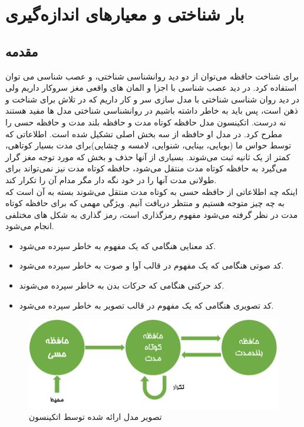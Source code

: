 \section{بار شناختی و معیارهای اندازه‌گیری}
\label{s:CognitiveLoad}
\subsection{مقدمه}
برای شناخت حافظه می‌توان از دو دید روانشناسی شناختی، و عصب شناسی می توان استفاده کرد. در دید عصب شناسی
با اجزا و المان های واقعی مغز سروکار داریم ولی در دید روان شناسی شناختی با مدل سازی سر و کار داریم که در تلاش برای شناخت و ذهن است، پس باید به خاطر داشته باشیم در روانشناسی شناختی مدل ها مفید هستند نه درست.
اتکینسون
\cite{atkinson1968human}
مدل حافظه کوتاه مدت و حافظه بلند مدت و حافظه حسی را مطرح کرد. در مدل او حافظه از سه بخش اصلی تشکیل شده است. اطلاعاتی که توسط حواس ما (بویایی، بینایی، شنوایی، لامسه و چشایی)برای مدت بسیار کوتاهی، کمتر از یک ثانیه
\cite{sperling1960information}
 ثبت می‌شوند. بسیاری از آنها حذف و بخش که مورد توجه مغز گرار می‌گیرد به حافظه کوتاه مدت منتقل می‌شود، حافظه کوتاه مدت نیز نمی‌تواند برای طولانی مدت آنها را در خود نگه دار مگر مدام آن را تکرار کند.
 \\
 اینکه چه اطلاعاتی از حافظه حسی به کوتاه مدت منتقل می‌شوند بسته به آن است که به چه چیز متوجه هستیم و منتظر دریافت آنیم.
 ویژگی مهمی که برای حافظه کوتاه مدت در نظر گرفته می‌شود مفهوم رمزگذاری
است، رمز گذاری به شکل های مختلفی انجام می‌شود.
\begin{itemize}
	\item کد معنایی 
	هنگامی که یک مفهوم به خاطر سپرده می‌شود.
	\item کد صوتی
	هنگامی که یک مفهوم در قالب آوا و صوت به خاطر سپرده می‌شود.
	\item کد حرکتی
	هنگامی که حرکات بدن به خاطر سپرده می‌شوند.
	\item کد تصویری
	هنگامی که یک مفهوم در قالب تصویر به خاطر سپرده می‌شود.
\end{itemize}

\begin{figure}[htbp]
	\centering
	\includegraphics[width=0.7\linewidth]{figures/memory}
	\caption[تصویر مدل حافظه]{تصویر مدل ارائه شده توسط اتکینسون}
	\label{fig:memory}
\end{figure}

